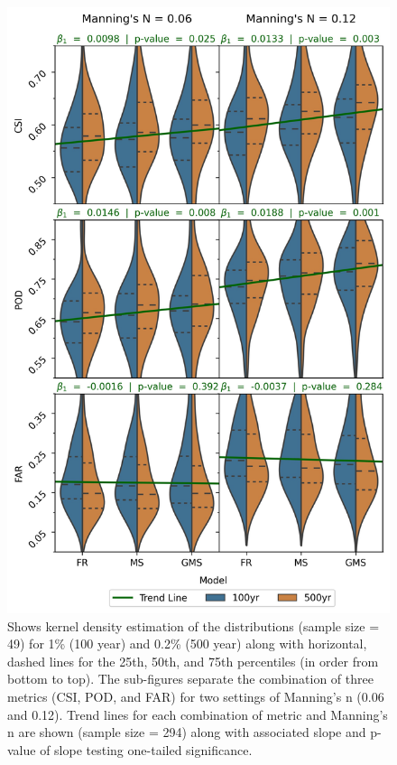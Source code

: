 \begin{figure}[H]
\centering
\includegraphics[scale=0.8]{figures/violin_plots.jpg}
\caption{Shows kernel density estimation of the distributions (sample size = 49) for 1\% (100 year) and 0.2\% (500 year) along with horizontal, dashed lines for the 25th, 50th, and 75th percentiles (in order from bottom to top).
The sub-figures separate the combination of three metrics (CSI, POD, and FAR) for two settings of Manning's n (0.06 and 0.12).
Trend lines for each combination of metric and Manning's n are shown (sample size = 294) along with associated slope and p-value of slope testing one-tailed significance.}
\label{fig:violin_plot}
\end{figure}
